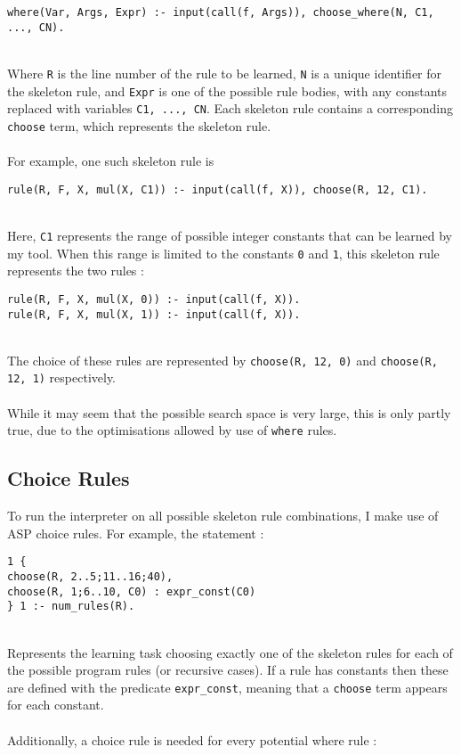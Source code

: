 \begin{lstlisting}
where(Var, Args, Expr) :- input(call(f, Args)), choose_where(N, C1, ..., CN).
\end{lstlisting}
\mbox{} \\
Where \lstinline!R! is the line number of the rule to be learned, \lstinline!N! is a unique identifier for the skeleton rule, and \lstinline!Expr! is one of the possible rule bodies, with any constants replaced with variables \lstinline!C1, ..., CN!. Each skeleton rule contains a corresponding \lstinline!choose! term, which represents the skeleton rule. \\ \\
For example, one such skeleton rule is \\

\begin{lstlisting}
rule(R, F, X, mul(X, C1)) :- input(call(f, X)), choose(R, 12, C1).
\end{lstlisting}
\mbox{}\\
Here, \lstinline!C1! represents the range of possible integer constants that can be learned by my tool. When this range is limited to the constants \lstinline!0! and \lstinline!1!, this skeleton rule represents the two rules : \\

\begin{lstlisting}
rule(R, F, X, mul(X, 0)) :- input(call(f, X)).
rule(R, F, X, mul(X, 1)) :- input(call(f, X)).
\end{lstlisting}
\mbox{}\\
The choice of these rules are represented by \lstinline!choose(R, 12, 0)! and \lstinline!choose(R, 12, 1)! respectively. \\ \\
While it may seem that the possible search space is very large, this is only partly true, due to the optimisations allowed by use of \lstinline!where! rules.

\subsection{Choice Rules}
To run the interpreter on all possible skeleton rule combinations, I make use of ASP choice rules. For example, the statement :\\

\begin{lstlisting}
1 {
choose(R, 2..5;11..16;40),
choose(R, 1;6..10, C0) : expr_const(C0)
} 1 :- num_rules(R).
\end{lstlisting}
\mbox{} \\
Represents the learning task choosing exactly one of the skeleton rules for each of the possible program rules (or recursive cases). If a rule has constants then these are defined with the predicate \lstinline!expr_const!, meaning that a \lstinline!choose! term appears for each constant. \\ \\
Additionally, a choice rule is needed for every potential where rule : \\

